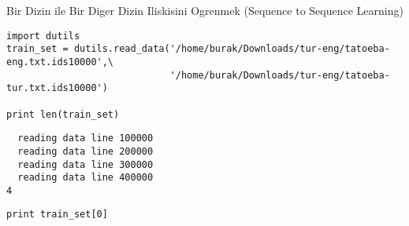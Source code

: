 \documentclass[12pt,fleqn]{article}\usepackage{../../common}
\begin{document}
Bir Dizin ile Bir Diger Dizin Iliskisini Ogrenmek (Sequence to Sequence Learning)

\begin{verbatim}
import dutils
train_set = dutils.read_data('/home/burak/Downloads/tur-eng/tatoeba-eng.txt.ids10000',\
                             '/home/burak/Downloads/tur-eng/tatoeba-tur.txt.ids10000')

print len(train_set)
\end{verbatim}

\begin{verbatim}
  reading data line 100000
  reading data line 200000
  reading data line 300000
  reading data line 400000
4
\end{verbatim}

\begin{verbatim}
print train_set[0]
\end{verbatim}
\end{document}
